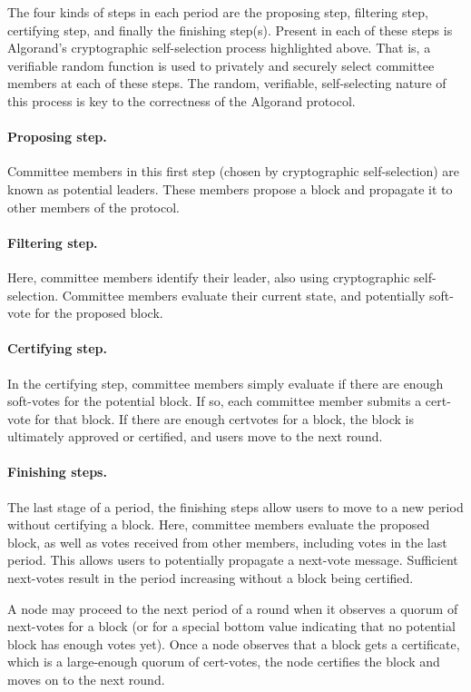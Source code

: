The four kinds of steps in each period are the proposing step, filtering step, certifying step, and finally the finishing step(s). Present in each of these steps is Algorand's cryptographic self-selection process highlighted above. That is, a verifiable random function is used to privately and securely select committee members at each of these steps. The random, verifiable, self-selecting nature of this process is key to the correctness of the Algorand protocol.

\paragraph{Proposing step.} Committee members in this first step (chosen by cryptographic self-selection) are known as potential leaders. These members propose a block and propagate it to other members of the protocol.

\paragraph{Filtering step.} Here, committee members identify their leader, also using cryptographic self-selection. Committee members evaluate their current state, and potentially soft-vote for the proposed block.

\paragraph{Certifying step.} In the certifying step, committee members simply evaluate if there are enough soft-votes for the potential block. If so, each committee member submits a cert-vote for that block. If there are enough certvotes for a block, the block is ultimately approved or certified, and users move to the next round.

\paragraph{Finishing steps.} The last stage of a period, the finishing steps allow users to move to a new period without certifying a block. Here, committee members evaluate the proposed block, as well as votes received from other members, including votes in the last period. This allows users to potentially propagate a next-vote message. Sufficient next-votes result in the period increasing without a block being certified.

A node may proceed to the next period of a round when it observes a quorum of next-votes for a block (or for a special bottom value indicating that no potential block has enough votes yet). Once a node observes that a block gets a certificate, which is a large-enough quorum of cert-votes, the node certifies the block and moves on to the next round.

